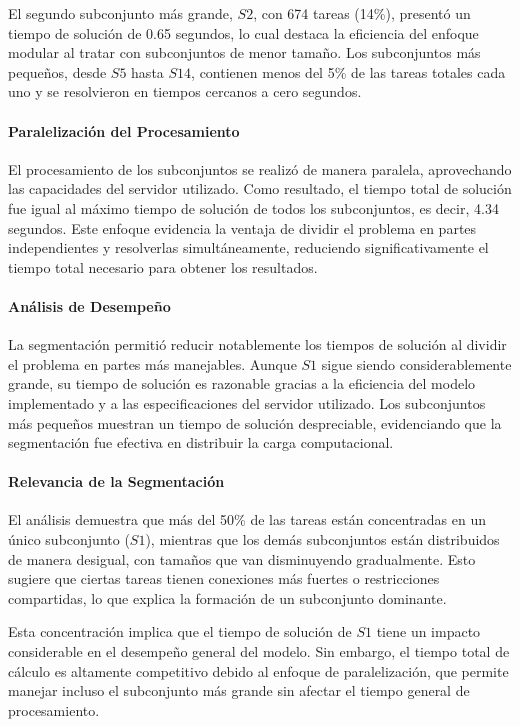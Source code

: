 \documentclass{article}
\begin{document}
El segundo subconjunto más grande, \( S2 \), con 674 tareas (14\%), presentó un tiempo de solución de 0.65 segundos, lo cual destaca la eficiencia del enfoque modular al tratar con subconjuntos de menor tamaño. Los subconjuntos más pequeños, desde \( S5 \) hasta \( S14 \), contienen menos del 5\% de las tareas totales cada uno y se resolvieron en tiempos cercanos a cero segundos.  

\paragraph{Paralelización del Procesamiento}  
El procesamiento de los subconjuntos se realizó de manera paralela, aprovechando las capacidades del servidor utilizado. Como resultado, el tiempo total de solución fue igual al máximo tiempo de solución de todos los subconjuntos, es decir, 4.34 segundos. Este enfoque evidencia la ventaja de dividir el problema en partes independientes y resolverlas simultáneamente, reduciendo significativamente el tiempo total necesario para obtener los resultados.

\paragraph{Análisis de Desempeño}  
La segmentación permitió reducir notablemente los tiempos de solución al dividir el problema en partes más manejables. Aunque \( S1 \) sigue siendo considerablemente grande, su tiempo de solución es razonable gracias a la eficiencia del modelo implementado y a las especificaciones del servidor utilizado. Los subconjuntos más pequeños muestran un tiempo de solución despreciable, evidenciando que la segmentación fue efectiva en distribuir la carga computacional.  

\paragraph{Relevancia de la Segmentación}  
El análisis demuestra que más del 50\% de las tareas están concentradas en un único subconjunto (\( S1 \)), mientras que los demás subconjuntos están distribuidos de manera desigual, con tamaños que van disminuyendo gradualmente. Esto sugiere que ciertas tareas tienen conexiones más fuertes o restricciones compartidas, lo que explica la formación de un subconjunto dominante.  

Esta concentración implica que el tiempo de solución de \( S1 \) tiene un impacto considerable en el desempeño general del modelo. Sin embargo, el tiempo total de cálculo es altamente competitivo debido al enfoque de paralelización, que permite manejar incluso el subconjunto más grande sin afectar el tiempo general de procesamiento.
\end{document}

